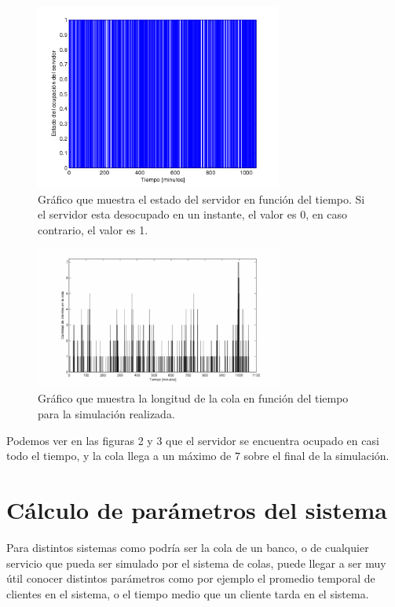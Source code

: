 \documentclass[10pt,journal,compsoc]{IEEEtran}
\begin{document}
\begin{figure}[t]%
\label{fig:estadoservidor}
\begin{center}
\centering
\includegraphics[width=3.2in]{estado_servidor.jpg}
\caption{Gr\'afico que muestra el estado del servidor en funci\'on del tiempo. Si el servidor esta desocupado en un instante, el valor es $0$, en caso contrario, el valor es 1.}
\end{center}
\end{figure}

\begin{figure}[t]%
\label{fig:longitudcola}
\begin{center}
\centering
\includegraphics[width=3.2in]{gente_en_cola.jpg}
\caption{Gr\'afico que muestra la longitud de la cola en funci\'on del tiempo para la simulaci\'on realizada.}
\end{center}
\end{figure}

Podemos ver en las figuras 2 y 3 que el servidor se encuentra ocupado en casi todo el tiempo, y la cola
llega a un m\'aximo de $7$ sobre el final de la simulaci\'on.

\section{C\'alculo de par\'ametros del sistema} %
Para distintos sistemas como podr\'ia ser la cola de un banco, o de cualquier servicio que pueda ser
simulado por el sistema de colas, puede llegar a ser muy \'util conocer distintos par\'ametros como
por ejemplo el promedio temporal de clientes en el sistema, o el tiempo medio que un cliente tarda
en el sistema.
\end{document}
